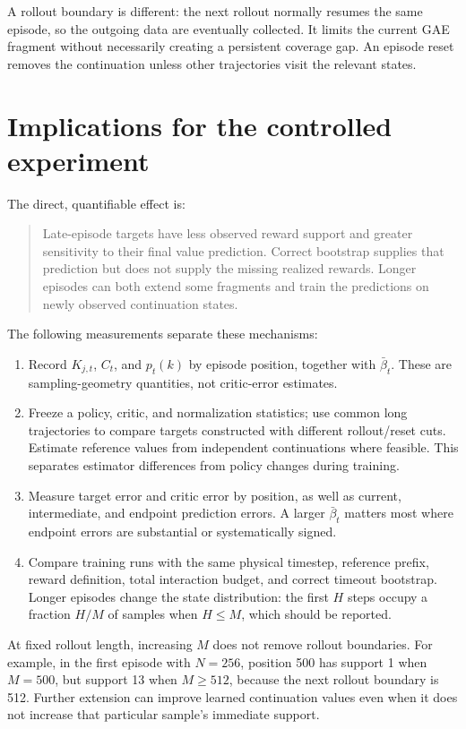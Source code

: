 \documentclass[11pt,a4paper]{article}
\numberwithin{equation}{section}
\begin{document}
A rollout boundary is different: the next rollout normally resumes the same
episode, so the outgoing data are eventually collected. It limits the current
GAE fragment without necessarily creating a persistent coverage gap. An episode
reset removes the continuation unless other trajectories visit the relevant states.

\section{Implications for the controlled experiment}
The direct, quantifiable effect is:
\begin{quote}
Late-episode targets have less observed reward support and greater sensitivity
to their final value prediction. Correct bootstrap supplies that prediction but
does not supply the missing realized rewards. Longer episodes can both extend
some fragments and train the predictions on newly observed continuation states.
\end{quote}
The following measurements separate these mechanisms:
\begin{enumerate}
\item Record $K_{j,t}$, $C_t$, and $p_t(k)$ by episode position, together with
$\bar\beta_t$. These are sampling-geometry quantities, not critic-error estimates.
\item Freeze a policy, critic, and normalization statistics; use common long
trajectories to compare targets constructed with different rollout/reset cuts.
Estimate reference values from independent continuations where feasible.
This separates estimator differences from policy changes during training.
\item Measure target error and critic error by position, as well as current,
intermediate, and endpoint prediction errors. A larger $\bar\beta_t$ matters
most where endpoint errors are substantial or systematically signed.
\item Compare training runs with the same physical timestep, reference prefix,
reward definition, total interaction budget, and correct timeout bootstrap.
Longer episodes change the state distribution: the first $H$ steps occupy a
fraction $H/M$ of samples when $H\le M$, which should be reported.
\end{enumerate}

At fixed rollout length, increasing $M$ does not remove rollout boundaries. For
example, in the first episode with $N=256$, position 500 has support 1 when
$M=500$, but support 13 when $M\ge512$, because the next rollout boundary is 512.
Further extension can improve learned continuation values even when it does not
increase that particular sample's immediate support.
\end{document}
